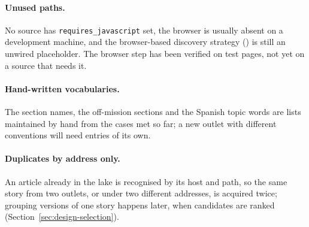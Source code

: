 \paragraph{Unused paths.} No source has \texttt{requires\_javascript}
set, the browser is usually absent on a development machine, and the
browser-based discovery strategy
() is still an unwired
placeholder. The browser step has been verified on test pages, not yet
on a source that needs it.

\paragraph{Hand-written vocabularies.} The section names, the
off-mission sections and the Spanish topic words are lists maintained
by hand from the cases met so far; a new outlet with different
conventions will need entries of its own.

\paragraph{Duplicates by address only.} An article already in the lake
is recognised by its host and path, so the same story from two outlets,
or under two different addresses, is acquired twice; grouping versions
of one story happens later, when candidates are ranked
(Section~\ref{sec:design-selection}).

